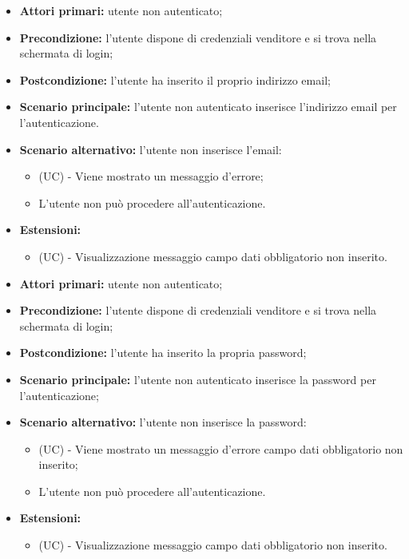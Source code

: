 \resetSubUC
{}
\begin{itemize}
	\item \textbf{Attori primari:} utente non autenticato;
	\item \textbf{Precondizione:} l'utente dispone di credenziali venditore e si trova nella schermata di login;
	\item \textbf{Postcondizione:} l'utente ha inserito il proprio indirizzo email;
	\item \textbf{Scenario principale:} l'utente non autenticato inserisce l'indirizzo email per l'autenticazione.
	\item \textbf{Scenario alternativo:} l'utente non inserisce l'email:
	\begin{itemize}
		\item (UC) - Viene mostrato un messaggio d'errore;
		\item L'utente non può procedere all'autenticazione.
	\end{itemize}
	\item \textbf{Estensioni:}
	\begin{itemize}
		\item (UC) - Visualizzazione messaggio campo dati obbligatorio non inserito.
	\end{itemize}
\end{itemize}

\begin{itemize}
	\item \textbf{Attori primari:} utente non autenticato;
	\item \textbf{Precondizione:} l'utente dispone di credenziali venditore e si trova nella schermata di login;
	\item \textbf{Postcondizione:} l'utente ha inserito la propria password;
	\item \textbf{Scenario principale:} l'utente non autenticato inserisce la password per l'autenticazione;
	\item \textbf{Scenario alternativo:} l'utente non inserisce la password:
	\begin{itemize}
		\item (UC) - Viene mostrato un messaggio d'errore campo dati obbligatorio non inserito;
		\item L'utente non può procedere all'autenticazione.
	\end{itemize}
	\item \textbf{Estensioni:}
	\begin{itemize}
		\item (UC) - Visualizzazione messaggio campo dati obbligatorio non inserito.
	\end{itemize}
\end{itemize}

